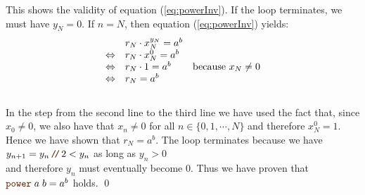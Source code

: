 This shows the validity of equation (\ref{eq:powerInv}).   If the  loop
terminates, we must have $y_N = 0$.  If $n=N$, then equation (\ref{eq:powerInv}) yields:
\\[0.2cm]
\hspace*{1.3cm}
$$
\begin{array}[t]{cll}
                 & r_N \cdot x_N^{y_N} = a^b \\
\Leftrightarrow  & r_N \cdot x_N^{0}  = a^b \\
\Leftrightarrow  & r_N \cdot 1       = a^b  & \mbox{because $x_N \not= 0$} \\
\Leftrightarrow  & r_N               = a^b
\end{array}
$$
\\[0.2cm]
In the step from the second line to the third line we have used the fact that, since $x_0 \not= 0$, we also
have that $x_n \not= 0$ for all $n \in \{0,1, \cdots, N\}$ and therefore $x_N^0 = 1$.  Hence we have shown that $r_N = a^b$.  The
 loop terminates because we have 
\\[0.2cm]
\hspace*{1.3cm}
$y_{n+1} = y_n \dv 2 < y_n$ \quad as long as \quad $y_n > 0$
\\[0.2cm]
and therefore $y_n$ must eventually become $0$.  Thus we have proven that
$\mytt{power}\;a\;b =a^b$ holds. \qed


